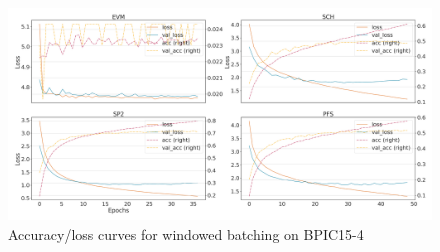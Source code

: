 \begin{figure}[!htb]
    \centering
    \includegraphics[width=\textwidth]{gfx/bpic2015_4/windowed_loss_acc_curve.png}
    \caption{Accuracy/loss curves for windowed batching on BPIC15-4}
\end{figure}
\FloatBarrier

